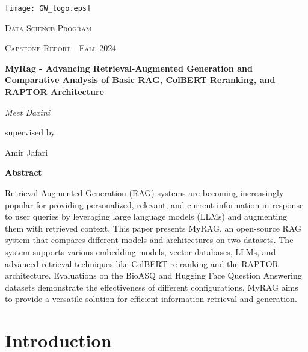 \documentclass{scrartcl}
\renewenvironment{abstract}{
    \centering
    \textbf{Abstract}
    \vspace{0.5cm}
    \par\itshape
    \begin{minipage}{0.7\linewidth}}{\end{minipage}
    \noindent\ignorespaces
}
\begin{document}
\begin{titlepage}
	\centering
	\texttt{[image: GW\_logo.eps]}\par
	\vspace{2cm}
	{\scshape\LARGE Data Science Program \par}
	\vspace{1cm}
	{\scshape\Large Capstone Report - Fall 2024\par}
	\vspace{1.5cm}
	{\huge\bfseries MyRag - Advancing Retrieval-Augmented Generation and Comparative Analysis of Basic RAG, ColBERT Reranking, and RAPTOR Architecture\par}
	\vspace{2cm}
	{\Large\itshape Meet Daxini \\}\par
	\vspace{1.5cm}
	supervised by\par
	Amir Jafari
\newpage

	\vfill
	\begin{abstract}
Retrieval-Augmented Generation (RAG) systems are becoming increasingly popular for providing personalized, relevant, and current information in response to user queries by leveraging large language models (LLMs) and augmenting them with retrieved context. This paper presents MyRAG, an open-source RAG system that compares different models and architectures on two datasets. The system supports various embedding models, vector databases, LLMs, and advanced retrieval techniques like ColBERT re-ranking and the RAPTOR architecture. Evaluations on the BioASQ and Hugging Face Question Answering datasets demonstrate the effectiveness of different configurations. MyRAG aims to provide a versatile solution for efficient information retrieval and generation.
	\end{abstract}
	\vfill
\end{titlepage}
\tableofcontents
\newpage
\section{Introduction}
\end{document}
